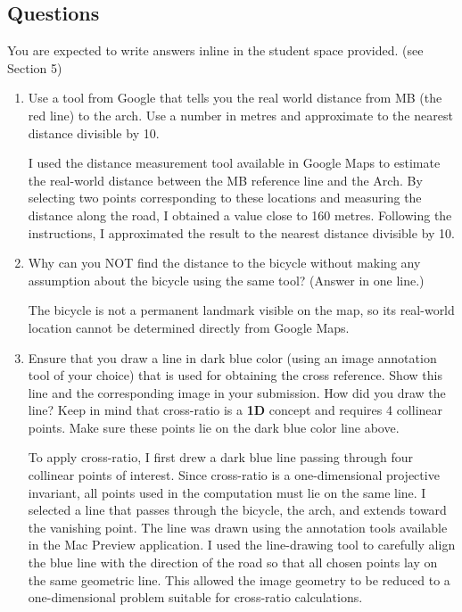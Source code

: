 \subsection{Questions}

You are expected to write answers inline in the student space provided. (see Section 5)

\begin{enumerate}
\item Use a tool from Google that tells you the real world distance from MB (the red line) to the arch.  Use a number in metres and approximate to the nearest distance divisible by 10. 
\begin{studentSpace}
    
    I used the distance measurement tool available in Google Maps to estimate the real-world distance between the MB reference line and the Arch. By selecting two points corresponding to these locations and measuring the distance along the road, I obtained a value close to 160 metres. Following the instructions, I approximated the result to the nearest distance divisible by 10.
\end{studentSpace}

\item Why can you NOT find the distance to the bicycle without making any assumption about the bicycle using the same tool? (Answer in one line.)
\begin{studentSpace}
    
    The bicycle is not a permanent landmark visible on the map, so its real-world location cannot be determined directly from Google Maps.
\end{studentSpace}

\item Ensure that you draw a line in dark blue color (using an image annotation tool of your choice) that is used for obtaining the cross reference.  Show this line and the corresponding image in your submission. How did you draw the line? Keep in mind that cross-ratio is a \textbf{1D} concept and requires 4 collinear points. Make sure these points lie on the dark blue color line above.
\begin{studentSpace}
    
    To apply cross-ratio, I first drew a dark blue line passing through four collinear points of interest. Since cross-ratio is a one-dimensional projective invariant, all points used in the computation must lie on the same line. I selected a line that passes through the bicycle, the arch, and extends toward the vanishing point. The line was drawn using the annotation tools available in the Mac Preview application. I used the line-drawing tool to carefully align the blue line with the direction of the road so that all chosen points lay on the same geometric line. This allowed the image geometry to be reduced to a one-dimensional problem suitable for cross-ratio calculations.
\end{studentSpace}


\end{enumerate}
